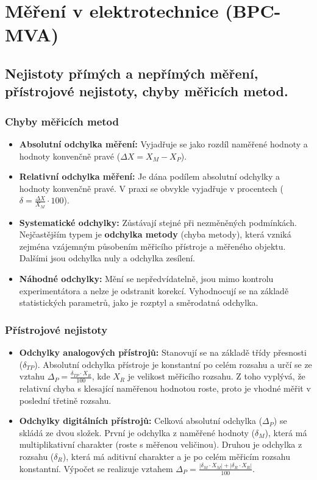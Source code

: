 \section{Měření v elektrotechnice (BPC-MVA)}
\subsection{Nejistoty přímých a nepřímých měření, přístrojové nejistoty, chyby měřicích metod.}
    \subsubsection{Chyby měřicích metod}
        \begin{itemize}
            \item \textbf{Absolutní odchylka měření:} Vyjadřuje se jako rozdíl naměřené hodnoty a hodnoty konvenčně pravé ($\Delta X = X_M - X_P$).
            \item \textbf{Relativní odchylka měření:} Je dána podílem absolutní odchylky a hodnoty konvenčně pravé. V praxi se obvykle vyjadřuje v procentech ($\delta = \frac{\Delta X}{X_M} \cdot 100$).
            \item \textbf{Systematické odchylky:} Zůstávají stejné při nezměněných podmínkách. Nejčastějším typem je \textbf{odchylka metody} (chyba metody), která vzniká zejména vzájemným působením měřicího přístroje a měřeného objektu. Dalšími jsou odchylka nuly a odchylka zesílení.
            \item \textbf{Náhodné odchylky:} Mění se nepředvídatelně, jsou mimo kontrolu experimentátora a nelze je odstranit korekcí. Vyhodnocují se na základě statistických parametrů, jako je rozptyl a směrodatná odchylka.
        \end{itemize}
    \subsubsection{Přístrojové nejistoty}
        \begin{itemize}
            \item \textbf{Odchylky analogových přístrojů:} Stanovují se na základě třídy přesnosti ($\delta_{TP}$). Absolutní odchylka přístroje je konstantní po celém rozsahu a určí se ze vztahu $\Delta_P = \frac{\delta_{TP} \cdot X_R}{100}$, kde $X_R$ je velikost měřicího rozsahu. Z toho vyplývá, že relativní chyba s klesající naměřenou hodnotou roste, proto je vhodné měřit v poslední třetině rozsahu.
            \item \textbf{Odchylky digitálních přístrojů:} Celková absolutní odchylka ($\Delta_P$) se skládá ze dvou složek. První je odchylka z naměřené hodnoty ($\delta_M$), která má multiplikativní charakter (roste s měřenou veličinou). Druhou je odchylka z rozsahu ($\delta_R$), která má aditivní charakter a je po celém měřicím rozsahu konstantní. Výpočet se realizuje vztahem $\Delta_P = \frac{|\delta_M \cdot X_M| + |\delta_R \cdot X_R|}{100}$.
        \end{itemize}
